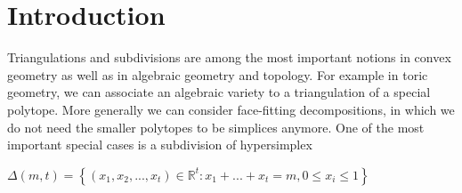 \documentclass[12pt, reqno]{amsart}
\theoremstyle{definition}
\theoremstyle{remark}
\numberwithin{equation}{section}
\begin{document}
\begin{abstract}

David Speyer proved that
the maximum number of  cells in a  regular matroid subdivision of the hypersimplex
$\Delta(m,t)$
is
$\binom{t-2}{m-1}$
, using the language of tropical geometry and properties of the Tutte polynomial of a matroid \cite[Theorem 6.1]{Speyer}.
In this paper, we prove this result in general, i.e. for arbitrary matroid subdivisions including the non-regular ones. We perform  a different  combinatorial way using our results in \cite{HHH} and  independent of tropical language. 
\newline
\newline
\noindent \textit{Keywords.} Algebraic Geometry, Matroid Theory, Hypersimplex, Inverse Limit, Tropical Geometry.    
\newline
\end{abstract} \maketitle






\tableofcontents



\section{Introduction}







Triangulations and subdivisions are among  the most important notions in convex geometry as well as  in algebraic geometry and topology. For example in toric geometry,  we can associate an algebraic  variety to a triangulation of a special polytope.   More generally we can consider face-fitting decompositions, in which we do not need the 
smaller polytopes to be simplices anymore. One of the most important special cases is a subdivision of hypersimplex 

\begin{center}
	$\Delta(m,t)= 
	\left\{(x_{1},x_{2},...,x_{t})\in \mathbb{R}^t:x_{1}+...+x_{t}=m, 0\le x_{i}\le 1\right\}$  
\end{center}
\end{document}
